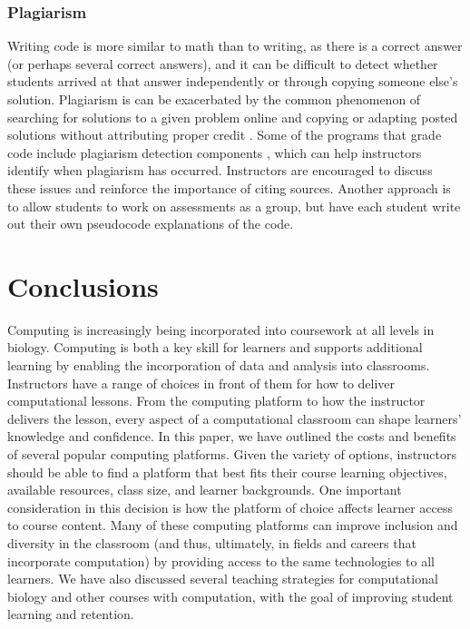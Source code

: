 \subsubsection{Plagiarism}
Writing code is more similar to math than to writing, as there is a correct answer (or perhaps several correct answers), and it can be difficult to detect whether students arrived at that answer independently or through copying someone else's solution.
Plagiarism is can be exacerbated by the common phenomenon of searching for solutions to a given problem online and copying or adapting posted solutions without attributing proper credit \citep{gaspar_restoring_2007}. 
Some of the programs that grade code include plagiarism detection components \citep{pears_survey_2007}, which can help instructors identify when plagiarism has occurred.
Instructors are encouraged to discuss these issues and reinforce the importance of citing sources.
Another approach is to allow students to work on assessments as a group, but have each student write out their own pseudocode explanations of the code.
 

\section{Conclusions}

Computing is increasingly being incorporated into coursework at all levels in biology.
Computing is both a key skill for learners and supports additional learning by enabling the incorporation of data and analysis into classrooms. 
Instructors have a range of choices in front of them for how to deliver computational lessons.
From the computing platform to how the instructor delivers the lesson, every aspect of a computational classroom can shape learners' knowledge and confidence. 
In this paper, we have outlined the costs and benefits of several popular computing platforms.
Given the variety of options, instructors should be able to find a platform that best fits their course learning objectives, available resources, class size, and learner backgrounds.
One important consideration in this decision is how the platform of choice affects learner access to course content.
Many of these computing platforms can improve inclusion and diversity in the classroom (and thus, ultimately, in fields and careers that incorporate computation) by providing access to the same technologies to all learners.
We have also discussed several teaching strategies for computational biology and other courses with computation, with the goal of improving student learning and retention. 

